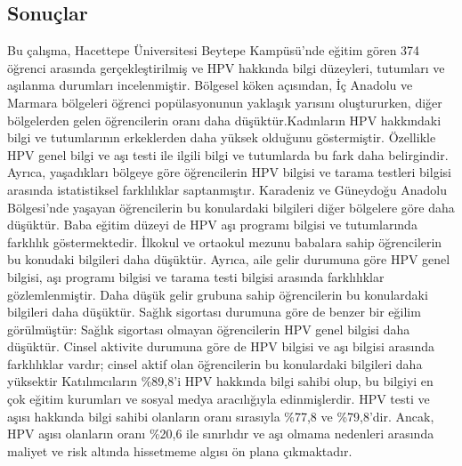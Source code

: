 \documentclass[turkish]{article}
\begin{document}
\subsection{Sonuçlar}
Bu çalışma, Hacettepe Üniversitesi Beytepe Kampüsü’nde eğitim gören 374 öğrenci arasında gerçekleştirilmiş ve HPV hakkında bilgi düzeyleri, tutumları ve aşılanma durumları incelenmiştir.
Bölgesel köken açısından, İç Anadolu ve Marmara bölgeleri öğrenci popülasyonunun yaklaşık yarısını oluştururken, diğer bölgelerden gelen öğrencilerin oranı daha düşüktür.Kadınların HPV hakkındaki bilgi ve tutumlarının erkeklerden daha yüksek olduğunu göstermiştir. Özellikle HPV genel bilgi ve aşı testi ile ilgili bilgi ve tutumlarda bu fark daha belirgindir. Ayrıca, yaşadıkları bölgeye göre öğrencilerin HPV bilgisi ve tarama testleri bilgisi arasında istatistiksel farklılıklar saptanmıştır. Karadeniz ve Güneydoğu Anadolu Bölgesi’nde yaşayan öğrencilerin bu konulardaki bilgileri diğer bölgelere göre daha düşüktür. Baba eğitim düzeyi de HPV aşı programı bilgisi ve tutumlarında farklılık göstermektedir. İlkokul ve ortaokul mezunu babalara sahip öğrencilerin bu konudaki bilgileri daha düşüktür. Ayrıca, aile gelir durumuna göre HPV genel bilgisi, aşı programı bilgisi ve tarama testi bilgisi arasında farklılıklar gözlemlenmiştir. Daha düşük gelir grubuna sahip öğrencilerin bu konulardaki bilgileri daha düşüktür. Sağlık sigortası durumuna göre de benzer bir eğilim görülmüştür: Sağlık sigortası olmayan öğrencilerin HPV genel bilgisi daha düşüktür. Cinsel aktivite durumuna göre de HPV bilgisi ve aşı bilgisi arasında farklılıklar vardır; cinsel aktif olan öğrencilerin bu konulardaki bilgileri daha yüksektir
Katılımcıların \%89,8’i HPV hakkında bilgi sahibi olup, bu bilgiyi en çok eğitim kurumları ve sosyal medya aracılığıyla edinmişlerdir. HPV testi ve aşısı hakkında bilgi sahibi olanların oranı sırasıyla \%77,8 ve \%79,8’dir. Ancak, HPV aşısı olanların oranı \%20,6 ile sınırlıdır ve aşı olmama nedenleri arasında maliyet ve risk altında hissetmeme algısı ön plana çıkmaktadır.
\end{document}

